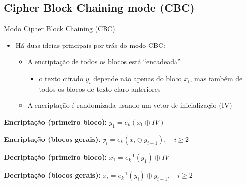 \documentclass{beamer}
\begin{document}
\subsection{Cipher Block Chaining mode (CBC)}
\begin{frame}{Modo Cipher Block Chaining (CBC)}

\begin{itemize}
    \item Há duas ideias principais por trás do modo CBC:
    \begin{itemize}
        \item A encriptação de todos os blocos está “encadeada”
        \begin{itemize}
            \item o texto cifrado $y_i$ depende não apenas do bloco $x_i$, mas também de todos os blocos de texto claro anteriores
        \end{itemize}
        \item A encriptação é randomizada usando um vetor de inicialização (IV)
    \end{itemize}
\end{itemize}

\vspace{1em}

\begin{block}{}
\textbf{Encriptação (primeiro bloco):} $y_1 = e_k(x_1 \oplus IV)$

\textbf{Encriptação (blocos gerais):} $y_i = e_k(x_i \oplus y_{i-1}), \quad i \geq 2$

\textbf{Decriptação (primeiro bloco):} $x_1 = e_k^{-1}(y_1) \oplus IV$

\textbf{Decriptação (blocos gerais):} $x_i = e_k^{-1}(y_i) \oplus y_{i-1}, \quad i \geq 2$
\end{block}

\end{frame}

\end{document}
